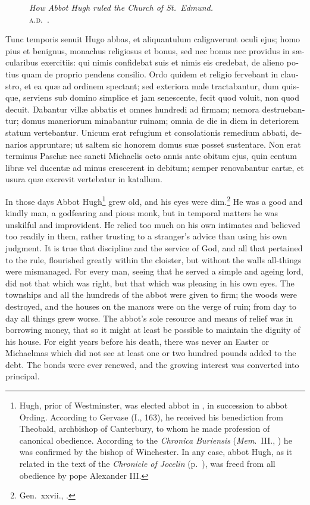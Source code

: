 \documentclass{book}
\newcommand{\blockhead}[4][]{
\begin{figure}
\centering
\vspace{#4}
\parbox{2.75cm}{\begin{center}\footnotesize \color{BrickRed} \emph{#2}\\ #1 \end{center}}
\end{figure}
}
\begin{document}
\begin{paracol}{2}

\begin{otherlanguage}{latin}
\blockhead[\textsc{a.d}.\ .]{How Abbot Hugh ruled the Church of St.\ Edmund.}{4}{-0.45cm}
Tunc temporis senuit Hugo abbas, et aliquantulum caligaverunt oculi ejus; homo pius et benignus, monachus religiosus et bonus, sed nec bonus nec providus in s\ae{}cularibus exercitiis: qui nimis confidebat suis et nimis eis credebat, de alieno potius quam de proprio pendens consilio. Ordo quidem et religio fervebant in claustro, et ea qu\ae{} ad ordinem spectant; sed exteriora male tractabantur, dum quisque, serviens sub domino simplice et jam senescente, fecit quod voluit, non quod decuit. Dabantur vill\ae{} abbatis et omnes hundredi ad firmam; nemora destruebantur; domus maneriorum minabantur ruinam; omnia de die in diem in deteriorem statum vertebantur. Unicum erat refugium et consolationis remedium abbati, denarios appruntare; ut saltem sic honorem domus su\ae{} posset sustentare. Non erat terminus Pasch\ae{} nec sancti Michaelis octo annis ante obitum ejus, quin centum libr\ae{} vel ducent\ae{} ad minus crescerent in debitum; semper renovabantur cart\ae{}, et usura qu\ae{} excrevit vertebatur in katallum.
 
\end{otherlanguage}

\switchcolumn

In those days Abbot Hugh\footnote{Hugh, prior of Westminster, was elected abbot in , in succession to abbot Ording. According to Gervase (I., 163), he received his benediction from Theobald, archbishop of Canterbury, to whom he made profession of canonical obedience. According to the \emph{Chronica Buriensis} (\emph{Mem}.\ III., ) he was confirmed by the bishop of Winchester. In any case, abbot Hugh, as it related in the text of the \emph{Chronicle of Jocelin} (p.\ ), was freed from all obedience by pope Alexander III.} grew old, and his eyes were dim.\footnote{Gen.\ xxvii., .} He was a good and kindly man, a godfearing and pious monk, but in temporal matters he was unskilful and improvident. He relied too much on his own intimates and believed too readily in them, rather trusting to a stranger's advice than using his own judgment. It is true that discipline and the service of God, and all that pertained to the rule, flourished greatly within the cloister, but without the walls all-things were mismanaged. For every man, seeing that he served a simple and ageing lord, did not that which was right, but that which was pleasing in his own eyes. The townships and all the hundreds of the abbot were given to firm; the woods were destroyed, and the houses on the manors were on the verge of ruin; from day to day all things grew worse. The abbot's sole resource and means of relief was in borrowing money, that so it might at least be possible to maintain the dignity of his house. For eight years before his death, there was never an Easter or Michaelmas which did not see at least one or two hundred pounds added to the debt. The bonds were ever renewed, and the growing interest was converted into principal.


\end{paracol}
\end{document}
